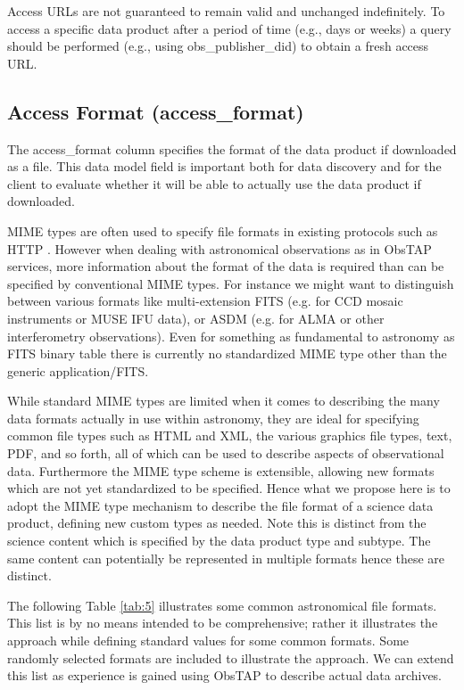 \documentclass[11pt,a4paper]{ivoa}
\begin{document}
Access URLs are not guaranteed to remain valid and unchanged indefinitely.  To access a specific data product after a
period of time (e.g., days or weeks) a query should be performed (e.g., using obs\_publisher\_did) to obtain a fresh
access URL.

\subsection{Access Format (access\_format)}
\label{bkm:Ref289893457}The access\_format column specifies the format of the data product if downloaded as a file. This
data model field is important both for data discovery and for the client to evaluate whether it will be able to
actually use the data product if downloaded.

MIME types are often used to specify file formats in existing protocols such as HTTP \citep{std:MIME_types}.  However
when dealing with astronomical observations as in ObsTAP services, more information about the format of the data is
required than can be specified by conventional MIME types.  For instance we might want to distinguish between various
formats like multi-extension FITS (e.g. for CCD mosaic instruments or MUSE IFU data), or ASDM (e.g. for ALMA or other
interferometry observations).  Even for something as fundamental to astronomy as FITS binary table there is currently
no standardized MIME type other than the generic application/FITS.

While standard MIME types are limited when it comes to describing the many data formats actually in use within
astronomy, they are ideal for specifying common file types such as HTML and XML, the various graphics file types, text,
PDF, and so forth, all of which can be used to describe aspects of observational data.  Furthermore the MIME type
scheme is extensible, allowing new formats which are not yet standardized to be specified.  Hence what we propose here
is to adopt the MIME type mechanism to describe the file format of a science data product, defining new custom types as
needed.  Note this is distinct from the science content which is specified by the data product type and subtype.  The
same content can potentially be represented in multiple formats hence these are distinct.

The following Table \ref{tab:5} illustrates some common astronomical file formats.  This list is by no means intended to be
comprehensive; rather it illustrates the approach while defining standard values for some common formats.  Some
randomly selected formats are included to illustrate the approach.  We can extend this list as experience is gained
using ObsTAP to describe actual data archives.
\end{document}
